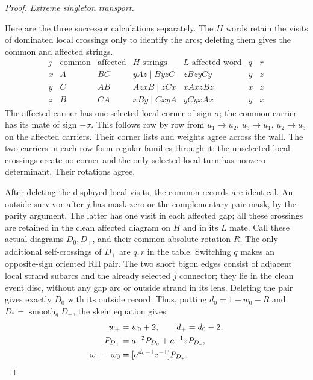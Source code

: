 \begin{proof}
\par\medskip\noindent\emph{Extreme singleton transport.}\par
Here are the three successor calculations separately. The $H$ words
retain the visits of dominated local crossings only to identify the
arcs; deleting them gives the common and affected strings.
\begin{equation}\label{rtr:singleton-table}
\begin{array}{c|c|c|c|c|cc}
 j&\text{common}&\text{affected}&H\text{ strings}
   &L\text{ affected word}&q&r\\ \hline
 x&A&BC&yAz\mid ByzC&zBzyCy&y&z\\
 y&C&AB&AzxB\mid zCx&xAxzBz&x&z\\
 z&B&CA&xBy\mid CxyA&yCyxAx&y&x
\end{array}
\end{equation}
The affected carrier has one selected-local corner of sign $\sigma$;
the common carrier has its mate of sign $-\sigma$. This follows
row by row from $u_1\to u_2$, $u_3\to u_1$, $u_2\to u_3$ on
the affected carriers. Their corner lists and weights agree across
the wall. The two carriers in each row form regular families through
it: the unselected local crossings create no corner and the only
selected local turn has nonzero determinant. Their rotations agree.

After deleting the displayed local visits, the common records are
identical. An outside survivor after $j$ has mask zero or the
complementary pair mask, by the parity argument. The latter has one
visit in each affected gap; all these crossings are retained in the
clean affected diagram on $H$ and in its $L$ mate. Call these actual
diagrams $D_0,D_+$, and their common absolute rotation $R$.
The only additional self-crossings of $D_+$ are $q,r$ in the table.
Switching $q$ makes an opposite-sign oriented RII pair. The two
short bigon edges consist of adjacent local strand subarcs and the
already selected $j$ connector; they lie in the clean event disc,
without any gap arc or outside strand in its lens. Deleting the pair
gives exactly $D_0$ with its outside record. Thus, putting
$d_0=1-w_0-R$ and $D_* =\operatorname{smooth}_qD_+$, the skein
equation gives
\begin{align}
 w_+&=w_0+2,\qquad d_+=d_0-2,\notag\\
 P_{D_+}&=a^{-2}P_{D_0}+a^{-1}zP_{D_*},\notag\\
 \omega_+-\omega_0&=[a^{d_0-1}z^{-1}]P_{D_*}.
 \label{rtr:singleton-skein}
\end{align}


\end{proof}
